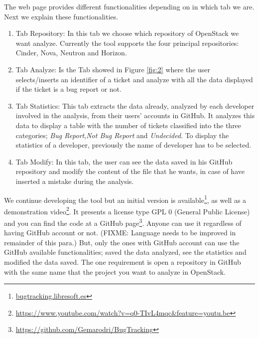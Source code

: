 \documentclass[runningheads,a4paper]{llncs}
\begin{document}
The web page provides different functionalities depending on in which tab we are. Next we explain these functionalities.
\begin{enumerate}
  \item Tab Repository: In this tab we choose which repository of OpenStack we want analyze. Currently the tool supports the four principal repositories: Cinder, Nova, Neutron and Horizon.
  \item Tab Analyze: Is the Tab showed in Figure \ref{fig:2} where the user selects/inserts an identifier of a ticket and analyze with all the data displayed if the ticket is a bug report or not.
  \item Tab Statistics: This tab extracts the data already, analyzed by each developer involved in the analysis, from their users' accounts in GitHub. It analyzes this data to display a table with the number of tickets classified into the three categories; \textit{Bug Report},\textit{Not Bug Report} and \textit{Undecided}. To display the statistics of a developer, previously the name of developer has to be selected.
  \item Tab Modify: In this tab, the user can see the data saved in his GitHub repository and modify the content of the file that he wants, in case of have inserted a mistake during the analysis.
\end{enumerate}

We continue developing the tool but an initial version is available\footnote{\url{bugtracking.libresoft.es}}, as well as a demonstration video\footnote{\url{https://www.youtube.com/watch?v=q0-TIvL4mqc&feature=youtu.be}}. It presents a license type GPL 0 (General Public License) and you can find the code at a GitHub page\footnote{\url{https://github.com/Gemarodri/BugTracking}}. Anyone can use it regardless of having GitHub account or not. (FIXME: Language needs to be improved in remainder of this para.) But, only the ones with GitHub account can use the GitHub available functionalities; saved the data analyzed, see the statistics and modified the data saved. The one requirement is open a repository in GitHub with the same name that the project you want to analyze in OpenStack.


\end{document}
